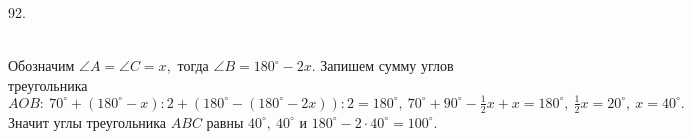 92. \begin{figure}[ht!]
\end{figure}\\
Обозначим $\angle A=\angle C=x,$ тогда $\angle B=180^\circ-2x.$ Запишем сумму углов треугольника $AOB:\ 70^\circ+(180^\circ-x):2+(180^\circ-(180^\circ-2x)):2=180^\circ,\ 70^\circ +90^\circ-\frac{1}{2}x+x=180^\circ,\ \frac{1}{2}x=20^\circ,\ x=40^\circ.$ Значит углы треугольника $ABC$ равны $40^\circ,\ 40^\circ$ и $180^\circ-2\cdot40^\circ=100^\circ.$\newpage\noindent
